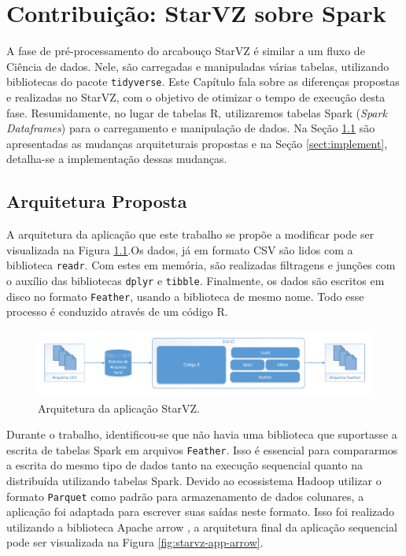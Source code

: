 \chapter{Contribuição: StarVZ sobre Spark} \label{ch:contribution}

A fase de pré-processamento do arcabouço StarVZ é similar a um fluxo de Ciência 
de dados. Nele, são carregadas e manipuladas várias tabelas, utilizando 
bibliotecas do pacote \texttt{tidyverse}. Este Capítulo fala sobre as diferenças 
propostas e realizadas no StarVZ, com o objetivo de otimizar o tempo de 
execução desta fase. Resumidamente, no lugar de tabelas R, utilizaremos tabelas
Spark (\emph{Spark Dataframes}) para o carregamento e manipulação de dados.
Na Seção \ref{sect:arch} são apresentadas as mudanças 
arquiteturais propostas e na Seção \ref{sect:implement}, detalha-se a 
implementação dessas mudanças.

\section{Arquitetura Proposta} \label{sect:arch}

A arquitetura da aplicação que este trabalho se propõe a modificar pode ser 
visualizada na Figura \ref{fig:starvz-app}.Os dados, já em formato CSV são lidos 
com a biblioteca \texttt{readr}. Com estes em memória, são realizadas filtragens 
e junções com o auxílio das bibliotecas \texttt{dplyr} e \texttt{tibble}. 
Finalmente, os dados são escritos em disco no formato \texttt{Feather}, usando a 
biblioteca de mesmo nome. Todo esse processo é conduzido através de um código R.

\begin{figure}[ht]
 \centerline{\includegraphics[width=1\textwidth]{./img/starvz-arch.pdf}}
 \caption{Arquitetura da aplicação StarVZ.}
 \label{fig:starvz-app}
\end{figure}

Durante o trabalho, identificou-se que não havia uma biblioteca que suportasse a 
escrita de tabelas Spark em arquivos \texttt{Feather}. Isso é essencial para 
compararmos a escrita do mesmo tipo de dados tanto na execução sequencial quanto 
na distribuída utilizando tabelas Spark. Devido ao ecossistema Hadoop utilizar 
o formato \texttt{Parquet} \cite{} como padrão para armazenamento de dados 
colunares, a aplicação foi adaptada para escrever suas saídas neste formato. 
Isso foi realizado utilizando a biblioteca Apache arrow \cite{}, a arquitetura 
final da aplicação sequencial pode ser visualizada na Figura 
\ref{fig:starvz-app-arrow}. 

